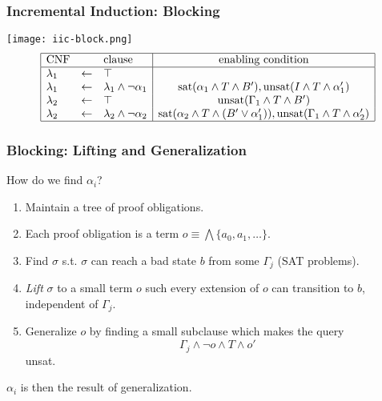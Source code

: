 \documentclass{beamer}
\begin{document}
\begin{frame}
	\frametitle{Incremental Induction: Blocking}
	\begin{center}
		\texttt{[image: iic-block.png]}
		\[ \begin{array}{|lcl|c|}
			\hline
			\mbox{CNF} &           & \mbox{clause} & \mbox{enabling condition}\\
			\hline
			\lambda_1 & \leftarrow & \top & \\
			\lambda_1 & \leftarrow & \lambda_1 \wedge \neg \alpha_1 & \mbox{sat}(\alpha_1 \wedge T \wedge B'), \mbox{unsat}(I \wedge T \wedge \alpha'_1) \\
			\lambda_2 & \leftarrow & \top & \mbox{unsat}(\Gamma_1 \wedge T \wedge B') \\
			\lambda_2 & \leftarrow & \lambda_2 \wedge \neg \alpha_2 & \mbox{sat}(\alpha_2 \wedge T \wedge (B' \vee \alpha'_1)),\mbox{unsat}(\Gamma_1 \wedge T \wedge \alpha'_2)\\
			\hline
		\end{array} \]
	\end{center}
\end{frame}

\begin{frame}
	\frametitle{Blocking: Lifting and Generalization}
	How do we find $\alpha_i$?
	\begin{enumerate}
		\item Maintain a tree of proof obligations.
		\item Each proof obligation is a term $o \equiv \bigwedge \{ a_0, a_1, \ldots \}$.
		\item Find $\sigma$ s.t. $\sigma$ can reach a bad state $b$
			from some $\Gamma_j$ (SAT problems).
		\item {\em Lift} $\sigma$ to a small term $o$ such every extension of $o$ can transition
			to $b$, independent of $\Gamma_j$. 
		\item Generalize $o$ by finding a small subclause which makes the query
			$$\Gamma_j \wedge \neg o \wedge T \wedge o'$$
			unsat.
	\end{enumerate}
		$\alpha_i$ is then the result of generalization.
\end{frame}
\end{document}

